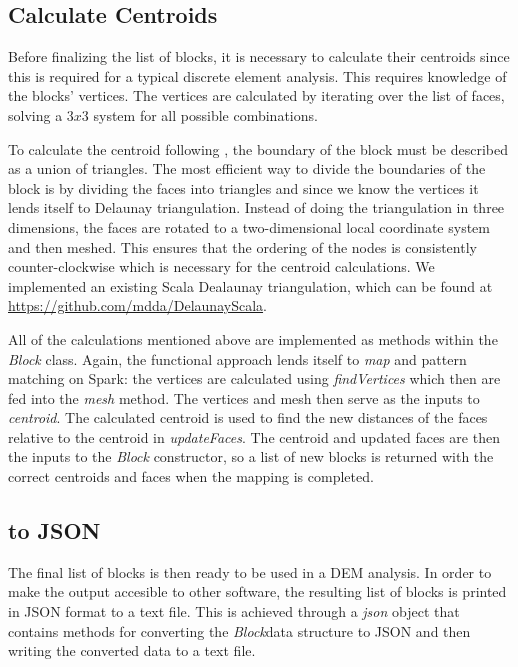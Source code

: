 \subsection{Calculate Centroids}
Before finalizing the list of blocks, it is necessary to calculate their centroids since this is required for a typical discrete element analysis. This requires knowledge of the blocks' vertices. The vertices are calculated by iterating over the list of faces, solving a $3x3$ system for all possible combinations. 

To calculate the centroid following \cite{centroid}, the boundary of the block must be described as a union of triangles. The most efficient way to divide the boundaries of the block is by dividing the faces into triangles and since we know the vertices it lends itself to Delaunay triangulation. Instead of doing the triangulation in three dimensions, the faces are rotated to a two-dimensional local coordinate system and then meshed. This ensures that the ordering of the nodes is consistently counter-clockwise which is necessary for the centroid calculations. We implemented an existing Scala Dealaunay triangulation, which can be found at \url{https://github.com/mdda/DelaunayScala}.

All of the calculations mentioned above are implemented as methods within the \textit{Block} class. Again, the functional approach lends itself to \textit{map} and pattern matching on Spark: the vertices are calculated using \textit{findVertices} which then are fed into the \textit{mesh} method. The vertices and mesh then serve as the inputs to \textit{centroid}. The calculated centroid is used to find the new distances of the faces relative to the centroid in \textit{updateFaces}. The centroid and updated faces are then the inputs to the \textit{Block} constructor, so a list of new blocks is returned with the correct centroids and faces when the mapping is completed.

\subsection{\Output to JSON}
The final list of blocks is then ready to be used in a DEM analysis. In order to make the output accesible to other software, the resulting list of blocks is printed in JSON format to a text file. This is achieved through a \textit{json} object that contains methods for converting the \textit{Block}data structure to JSON and then writing the converted data to a text file. 
